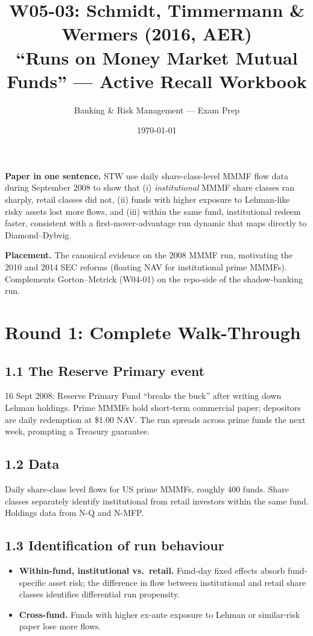 \documentclass[11pt]{article}
\title{W05-03: Schmidt, Timmermann \& Wermers (2016, AER) \\
\large ``Runs on Money Market Mutual Funds'' --- Active Recall Workbook}
\author{Banking \& Risk Management --- Exam Prep}
\date{\today}
\begin{document}
\maketitle

\begin{keybox}
\textbf{Paper in one sentence.} STW use daily share-class-level MMMF flow data during September 2008 to show that (i) \emph{institutional} MMMF share classes ran sharply, retail classes did not, (ii) funds with higher exposure to Lehman-like risky assets lost more flows, and (iii) within the same fund, institutional redeem faster, consistent with a first-mover-advantage run dynamic that maps directly to Diamond--Dybvig.

\textbf{Placement.} The canonical evidence on the 2008 MMMF run, motivating the 2010 and 2014 SEC reforms (floating NAV for institutional prime MMMFs). Complements Gorton--Metrick (W04-01) on the repo-side of the shadow-banking run.
\end{keybox}

\section*{Round 1: Complete Walk-Through}

\subsection*{1.1 The Reserve Primary event}
16 Sept 2008: Reserve Primary Fund ``breaks the buck'' after writing down Lehman holdings. Prime MMMFs hold short-term commercial paper; depositors are daily redemption at \$1.00 NAV. The run spreads across prime funds the next week, prompting a Treasury guarantee.

\subsection*{1.2 Data}
Daily share-class level flows for US prime MMMFs, roughly 400 funds. Share classes separately identify institutional from retail investors within the same fund. Holdings data from N-Q and N-MFP.

\subsection*{1.3 Identification of run behaviour}
\begin{itemize}
\item \textbf{Within-fund, institutional vs.\ retail.} Fund-day fixed effects absorb fund-specific asset risk; the difference in flow between institutional and retail share classes identifies differential run propensity.
\item \textbf{Cross-fund.} Funds with higher ex-ante exposure to Lehman or similar-risk paper lose more flows.
\end{itemize}
\end{document}
